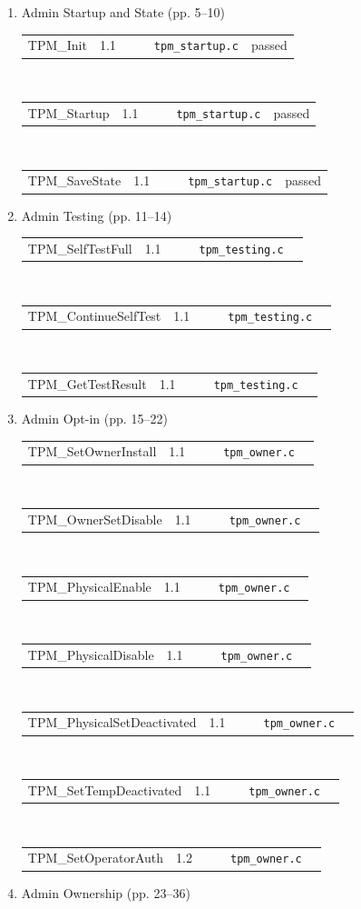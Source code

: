 \documentclass[runningheads]{llncs}
\begin{document}
\newcommand{\tpmcmd}[6]{
	\begin{tabular}{p{4.5cm}|p{0.35cm}|p{0.4cm}|p{0.25cm}|p{2.5cm}|p{2cm}}
		\rowcolor{\tpmcolor}
			{\scriptsize\textsf{#1}} &
			{\scriptsize\textsf{#2}} &
			{\scriptsize\makebox[0.4cm][r]{#3}} &
			{\scriptsize\makebox[0.25cm][c]{#4}} &
			{\scriptsize\texttt{#5}} &
			{\scriptsize #6}\\
	\end{tabular}
}
\newcommand{\tpmcmdr}[6]{
	\renewcommand{\tpmcolor}{\tpmred}
	\tpmcmd{#1}{#2}{#3}{#4}{#5}{#6}
	\renewcommand{\tpmcolor}{tpmgray}
}
\newcommand{\tpmcmdg}[6]{
	\renewcommand{\tpmcolor}{\tpmgreen}
	\tpmcmd{#1}{#2}{#3}{#4}{#5}{#6}
	\renewcommand{\tpmcolor}{tpmgray}
}
\newcommand{\tpmcmdy}[6]{
	\renewcommand{\tpmcolor}{\tpmyellow}
	\tpmcmd{#1}{#2}{#3}{#4}{#5}{#6}
	\renewcommand{\tpmcolor}{tpmgray}
}
\begin{enumerate}
	\item Admin Startup and State (pp. 5--10)\\
\tpmcmdg{TPM\_Init}{1.1}{151}{M}{tpm\_startup.c}{passed \cite{trousers,Sadeghi}}\\
\tpmcmdg{TPM\_Startup}{1.1}{153}{M}{tpm\_startup.c}{passed \cite{trousers,Sadeghi}}\\
\tpmcmdg{TPM\_SaveState}{1.1}{152}{M}{tpm\_startup.c}{passed \cite{trousers,Sadeghi}}
	\item Admin Testing (pp. 11--14)\\
\tpmcmdg{TPM\_SelfTestFull}{1.1}{80}{M}{tpm\_testing.c}{}\\
\tpmcmdg{TPM\_ContinueSelfTest}{1.1}{83}{M}{tpm\_testing.c}{}\\
\tpmcmdg{TPM\_GetTestResult}{1.1}{84}{M}{tpm\_testing.c}{}
	\item Admin Opt-in (pp. 15--22)\\
\tpmcmdg{TPM\_SetOwnerInstall}{1.1}{113}{M}{tpm\_owner.c}{}\\
\tpmcmdg{TPM\_OwnerSetDisable}{1.1}{110}{M}{tpm\_owner.c}{}\\
\tpmcmdg{TPM\_PhysicalEnable}{1.1}{111}{M}{tpm\_owner.c}{}\\
\tpmcmdg{TPM\_PhysicalDisable}{1.1}{112}{M}{tpm\_owner.c}{}\\
\tpmcmdg{TPM\_PhysicalSetDeactivated}{1.1}{114}{M}{tpm\_owner.c}{}\\
\tpmcmdg{TPM\_SetTempDeactivated}{1.1}{115}{M}{tpm\_owner.c}{}\\
\tpmcmdg{TPM\_SetOperatorAuth}{1.2}{116}{M}{tpm\_owner.c}{}
	\item Admin Ownership (pp. 23--36)\\

\end{enumerate}
\end{document}

